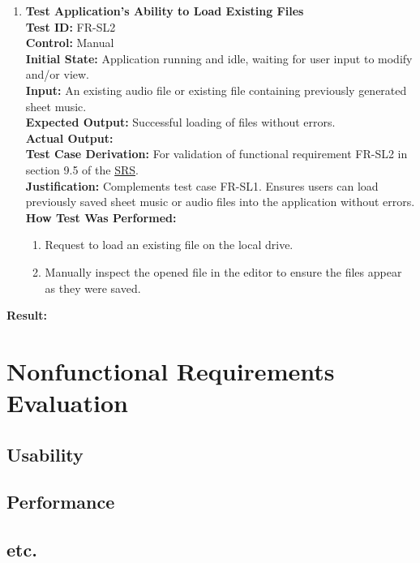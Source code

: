 \documentclass[12pt, titlepage]{article}
\begin{document}
\begin{enumerate}
    \item \textbf{Test Application’s Ability to Load Existing Files} \\
      \newline
      \textbf{Test ID:} FR-SL2 \\
      \textbf{Control:} Manual \\
      \textbf{Initial State:} Application running and idle, waiting for user input to modify and/or view. \\
      \textbf{Input:} An existing audio file or existing file containing previously generated sheet music. \\
      \textbf{Expected Output:} Successful loading of files without errors. \\
      \textbf{Actual Output:} \\
      \textbf{Test Case Derivation:} For validation of functional requirement FR-SL2 in section 9.5 of the 
      \href{https://github.com/emilyperica/ScoreGen/blob/main/docs/SRS-Volere/SRS.pdf}{SRS}. \\
      \textbf{Justification:} Complements test case FR-SL1. Ensures users can load previously saved sheet music or 
      audio files into the application without errors.\\
      \textbf{How Test Was Performed:}
      \begin{enumerate}
          \item Request to load an existing file on the local drive.
          \item Manually inspect the opened file in the editor to ensure the files appear as they were saved.
      \end{enumerate}
  \end{enumerate}
  \textbf{Result:}

\section{Nonfunctional Requirements Evaluation}

\subsection{Usability}
		
\subsection{Performance}

\subsection{etc.}
\end{document}
